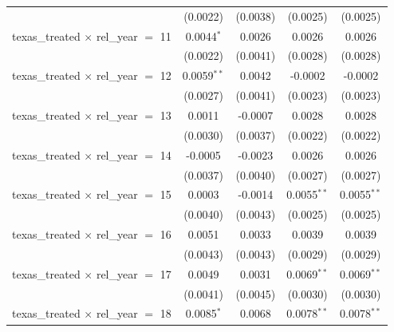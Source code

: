 \begin{tabular}{lcccc}
                                                & (0.0022)        & (0.0038)            & (0.0025)               & (0.0025)\\   
   texas\_treated $\times$ rel\_year $=$ 11     & 0.0044$^{*}$    & 0.0026              & 0.0026                 & 0.0026\\   
                                                & (0.0022)        & (0.0041)            & (0.0028)               & (0.0028)\\   
   texas\_treated $\times$ rel\_year $=$ 12     & 0.0059$^{**}$   & 0.0042              & -0.0002                & -0.0002\\   
                                                & (0.0027)        & (0.0041)            & (0.0023)               & (0.0023)\\   
   texas\_treated $\times$ rel\_year $=$ 13     & 0.0011          & -0.0007             & 0.0028                 & 0.0028\\   
                                                & (0.0030)        & (0.0037)            & (0.0022)               & (0.0022)\\   
   texas\_treated $\times$ rel\_year $=$ 14     & -0.0005         & -0.0023             & 0.0026                 & 0.0026\\   
                                                & (0.0037)        & (0.0040)            & (0.0027)               & (0.0027)\\   
   texas\_treated $\times$ rel\_year $=$ 15     & 0.0003          & -0.0014             & 0.0055$^{**}$          & 0.0055$^{**}$\\   
                                                & (0.0040)        & (0.0043)            & (0.0025)               & (0.0025)\\   
   texas\_treated $\times$ rel\_year $=$ 16     & 0.0051          & 0.0033              & 0.0039                 & 0.0039\\   
                                                & (0.0043)        & (0.0043)            & (0.0029)               & (0.0029)\\   
   texas\_treated $\times$ rel\_year $=$ 17     & 0.0049          & 0.0031              & 0.0069$^{**}$          & 0.0069$^{**}$\\   
                                                & (0.0041)        & (0.0045)            & (0.0030)               & (0.0030)\\   
   texas\_treated $\times$ rel\_year $=$ 18     & 0.0085$^{*}$    & 0.0068              & 0.0078$^{**}$          & 0.0078$^{**}$\\   

\end{tabular}
